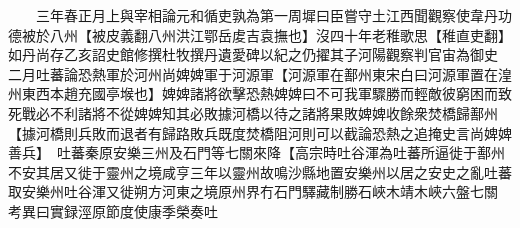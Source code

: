 　　三年春正月上與宰相論元和循吏孰為第一周墀曰臣嘗守土江西聞觀察使韋丹功德被於八州【被皮義翻八州洪江鄂岳䖍吉袁撫也】沒四十年老稚歌思【稚直吏翻】如丹尚存乙亥詔史館修撰杜牧撰丹遺愛碑以紀之仍擢其子河陽觀察判官宙為御史　二月吐蕃論恐熱軍於河州尚婢婢軍于河源軍【河源軍在鄯州東宋白曰河源軍置在湟州東西本趙充國亭堠也】婢婢諸將欲擊恐熱婢婢曰不可我軍驟勝而輕敵彼窮困而致死戰必不利諸將不從婢婢知其必敗據河橋以待之諸將果敗婢婢收餘衆焚橋歸鄯州【據河橋則兵敗而退者有歸路敗兵既度焚橋阻河則可以截論恐熱之追掩史言尚婢婢善兵】　吐蕃秦原安樂三州及石門等七關來降【高宗時吐谷渾為吐蕃所逼徙于鄯州不安其居又徙于靈州之境咸亨三年以靈州故鳴沙縣地置安樂州以居之安史之亂吐蕃取安樂州吐谷渾又徙朔方河東之境原州界冇石門驛藏制勝石峽木靖木峽六盤七關　考異曰實録涇原節度使康季榮奏吐